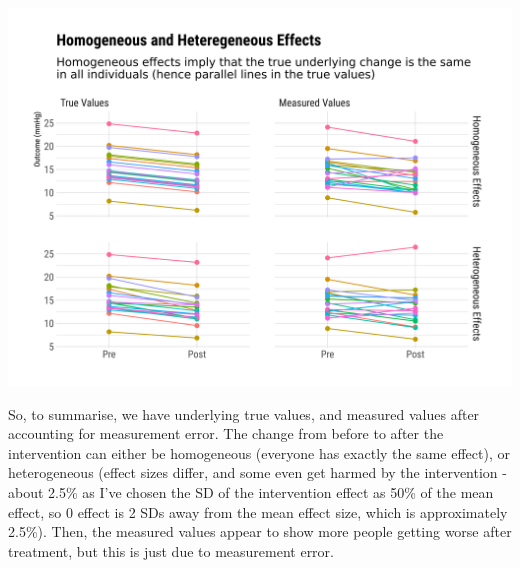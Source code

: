 \documentclass[
]{article}
\begin{document}
\includegraphics{figures/unnamed-chunk-52-1.png}

So, to summarise, we have underlying true values, and measured values
after accounting for measurement error. The change from before to after
the intervention can either be homogeneous (everyone has exactly the
same effect), or heterogeneous (effect sizes differ, and some even get
harmed by the intervention - about 2.5\% as I've chosen the SD of the
intervention effect as 50\% of the mean effect, so 0 effect is 2 SDs
away from the mean effect size, which is approximately 2.5\%). Then, the
measured values appear to show more people getting worse after
treatment, but this is just due to measurement error.
\end{document}
